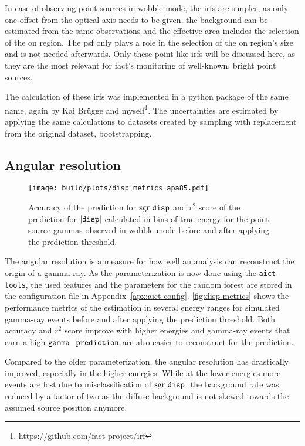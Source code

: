 In case of observing point sources in wobble mode, the \glspl{irf} are simpler,
as only one offset from the optical axis needs to be given,
the background can be estimated from the same observations and the effective area
includes the selection of the on region. 
The \gls{psf} only plays a role in the selection of the on region's size and
is not needed afterwards.
Only these point-like \glspl{irf} will be discussed here, as they are
the most relevant for \gls{fact}'s monitoring of well-known, bright point sources.

The calculation of these \glspl{irf} was implemented in a python package of the 
same name, again by Kai Brügge and myself\footnote{\url{https://github.com/fact-project/irf}}.
The uncertainties are estimated by applying the same calculations to 
datasets created by sampling with replacement from the original dataset, bootstrapping.

\subsection{Angular resolution}\label{sec:psf}
\begin{figure}
  \centering
  \texttt{[image: build/plots/disp\_metrics\_apa85.pdf]}
  \caption{%
    Accuracy of the prediction for $\operatorname{sgn}{\mathtt{disp}}$ and $r^2$ score 
    of the prediction for $\vert\mathtt{disp}\vert$ calculated in bins of true energy 
    for the point source gammas observed in wobble mode before and after applying
    the prediction threshold.
  }\label{fig:disp-metrics}
\end{figure}

\noindent The angular resolution is a measure for how well an analysis can reconstruct
the origin of a gamma ray.
As the  parameterization is now done using the \texttt{aict-tools},
the used features and the parameters for the random forest are stored
in the configuration file in Appendix~\ref{apx:aict-config}.
\autoref{fig:disp-metrics} shows the performance metrics of the  estimation
in several energy ranges for simulated gamma-ray events before and after applying the
prediction threshold.
Both accuracy and $r^2$ score improve with higher energies
and gamma-ray events that earn a high $\mathtt{gamma\_prediction}$ are also easier to
reconstruct for the  prediction.


Compared to the older \facttools{} parameterization, the angular resolution
has drastically improved, especially in the higher energies.
While at the lower energies more events are lost due to misclassification of
$\operatorname{sgn}\mathtt{disp}$, the background rate was reduced by a factor of two as 
the diffuse background is not skewed towards the assumed source position anymore.


